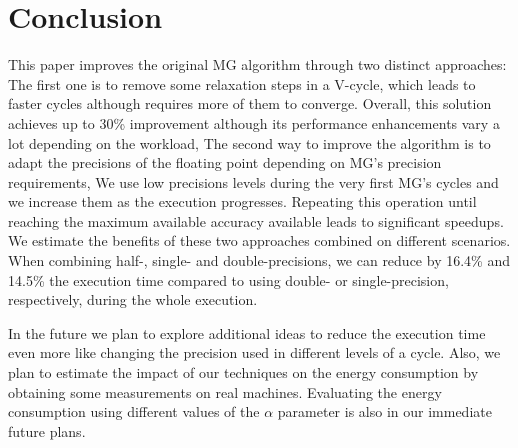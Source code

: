 \section{Conclusion}
\label{sec:conclusions}

This paper improves the original MG algorithm through two distinct approaches: The first
one is to remove some relaxation steps in a V-cycle, which leads to faster
cycles although requires more of them to converge.  Overall, this solution
achieves up to 30\% improvement although its performance enhancements vary a
lot depending on the workload, The second way to improve the algorithm is to
adapt the precisions of the floating point depending on MG's precision
requirements, We use low precisions levels during the very first MG's cycles
and we increase them as the execution progresses.  Repeating this operation
until reaching the maximum available accuracy available leads to significant
speedups.  We estimate the benefits of these two approaches combined on
different scenarios.  When combining half-, single- and double-precisions, we
can reduce by 16.4\% and 14.5\% the execution time compared to using double- or
single-precision, respectively, during the whole execution.

In the future we plan to explore additional ideas to reduce the execution time
even more like changing the precision used in different levels of a cycle.
Also, we plan to estimate the impact of our techniques on the energy
consumption by obtaining some measurements on real machines.  Evaluating the
energy consumption using different values of the $\alpha$ parameter is also in
our immediate future plans.




